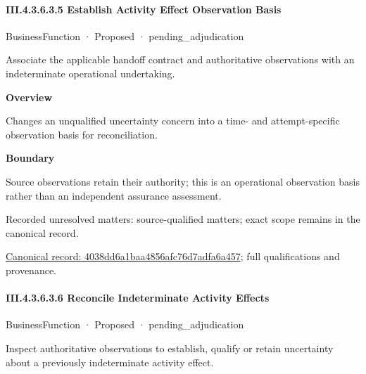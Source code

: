 \paragraph*{III.4.3.6.3.5 Establish Activity Effect Observation Basis}
\label{navigation:III.4.3.6.3.5}

\label{element:4038dd6a1baa4856afc76d7adfa6a457}
{\small BusinessFunction · Proposed · pending\_adjudication}\par

Associate the applicable handoff contract and authoritative observations with an indeterminate operational undertaking.



\textbf{Overview}



Changes an unqualified uncertainty concern into a time- and attempt-specific observation basis for reconciliation.



\textbf{Boundary}



Source observations retain their authority; this is an operational observation basis rather than an independent assurance assessment.


{\small Recorded unresolved matters: source-qualified matters; exact scope remains in the canonical record.}\par
{\footnotesize \href{../../../../../../../../continuum/business/business-function/4038dd6a1baa4856afc76d7adfa6a457.md}{Canonical record: 4038dd6a1baa4856afc76d7adfa6a457}; full qualifications and provenance.}\par
\paragraph*{III.4.3.6.3.6 Reconcile Indeterminate Activity Effects}
\label{navigation:III.4.3.6.3.6}

\label{element:eace49fe7b304ad786d460ccef622378}
{\small BusinessFunction · Proposed · pending\_adjudication}\par

Inspect authoritative observations to establish, qualify or retain uncertainty about a previously indeterminate activity effect.



